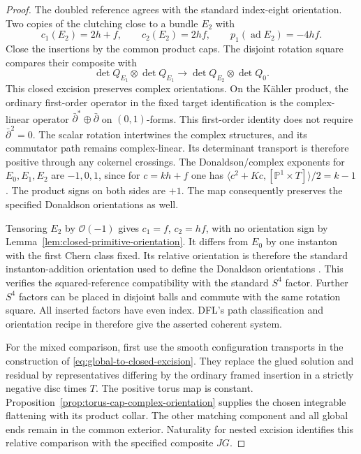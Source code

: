 \documentclass[11pt]{amsart}
\theoremstyle{definition}
\theoremstyle{remark}
\theoremstyle{plain}
\newcommand{\PP}{\mathbb{P}}
\begin{document}
\begin{proof}
The doubled reference agrees with the standard
index-eight orientation. Two copies of the
clutching close to a bundle $E_2$ with
\[
 c_1(E_2)=2h+f,\qquad c_2(E_2)=2hf,\qquad
                      p_1(\operatorname{ad}E_2)=-4hf.
\]
Close the insertions by the common product
caps. The disjoint rotation square compares
their composite with
\[
 \det Q_{E_1}\otimes\det Q_{E_1}
                \longrightarrow\det Q_{E_2}\otimes\det Q_0.
\]
This closed excision preserves complex
orientations. On the Kähler product, the
ordinary first-order operator in the fixed
target identification is the complex-linear
operator $\bar\partial^*\oplus\bar\partial$
on $(0,1)$-forms. This first-order identity
does not require $\bar\partial^2=0$.
The scalar rotation intertwines the complex
structures, and its commutator path remains
complex-linear. Its determinant transport
is therefore positive through any cokernel
crossings. The Donaldson/complex exponents
for $E_0,E_1,E_2$ are $-1,0,1$, since
for $c=kh+f$ one has
$\langle c^2+Kc,[\PP^1\times T]\rangle/2=k-1$.
The product signs on both sides are $+1$.
The map consequently preserves the specified
Donaldson orientations as well.

Tensoring $E_2$ by $\mathcal O(-1)$ gives
$c_1=f$, $c_2=hf$, with no orientation sign
by Lemma~\ref{lem:closed-primitive-orientation}.
It differs from $E_0$ by one instanton with
the first Chern class fixed. Its relative
orientation is therefore the standard
instanton-addition orientation used to define
the Donaldson orientations
\cite[Proposition~3.20]{Donaldson87}.
This verifies the squared-reference
compatibility with the standard $S^4$ factor.
Further $S^4$ factors can be placed in
disjoint balls and commute with the same
rotation square. All inserted factors
have even index. DFL's path classification
and orientation recipe in
\cite[Section~2.4, pp.~20--22]{DaeFukLip21a}
therefore give the asserted coherent system.

For the mixed comparison, first use the smooth
configuration transports in the construction of
\eqref{eq:global-to-closed-excision}. They
replace the glued solution and residual by
representatives differing by the ordinary
framed insertion in a strictly negative
disc times $T$. The positive torus map
is constant. Proposition~\ref{prop:torus-cap-complex-orientation}
supplies the chosen integrable flattening
with its product collar. The other matching
component and all global ends remain in
the common exterior. Naturality for nested
excision identifies this relative comparison
with the specified composite $JG$.


\end{proof}
\end{document}
